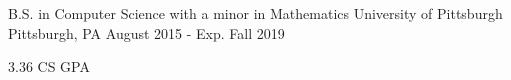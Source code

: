 
\vspace{-7mm}


\vspace{0mm}
\begin{cventries}

  \cventry
    {B.S. in Computer Science with a minor in Mathematics} %
    {University of Pittsburgh} %
    {Pittsburgh, PA} %
    {August 2015 - Exp. Fall 2019} %
    {
      \begin{cvitems} %
        \item {3.36 CS GPA}
      \end{cvitems}
    }
    
  \vspace{-6mm}
  
\end{cventries}